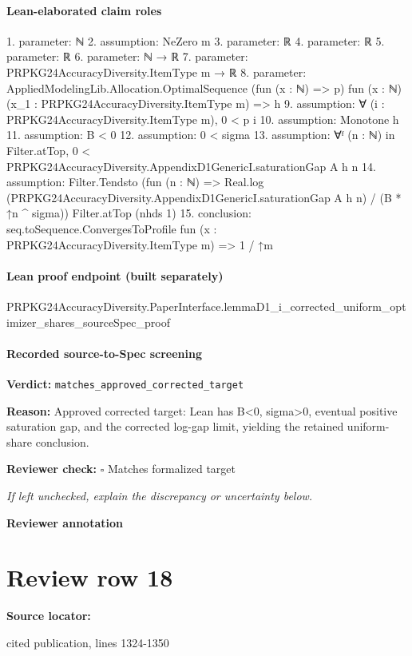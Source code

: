 \documentclass[10pt]{article}
\newcommand{\reviewerbox}{%
  \par\noindent\fbox{\parbox{0.96\linewidth}{\rule{0pt}{0.38in}}}\par
}
\newcommand{\reviewmatch}[1]{%
  \par\noindent\textbf{Reviewer check:} $\square$\; #1\par
  \noindent\emph{If left unchecked, explain the discrepancy or uncertainty below.}\par
}
\begin{document}
\paragraph{Lean-elaborated claim roles}\begin{ReviewVerbatim}
1. parameter: ℕ
2. assumption: NeZero m
3. parameter: ℝ
4. parameter: ℝ
5. parameter: ℝ
6. parameter: ℕ → ℝ
7. parameter: PRPKG24AccuracyDiversity.ItemType m → ℝ
8. parameter: AppliedModelingLib.Allocation.OptimalSequence (fun (x : ℕ) => p)
  fun (x : ℕ) (x_1 : PRPKG24AccuracyDiversity.ItemType m) => h
9. assumption: ∀ (i : PRPKG24AccuracyDiversity.ItemType m), 0 < p i
10. assumption: Monotone h
11. assumption: B < 0
12. assumption: 0 < sigma
13. assumption: ∀ᶠ (n : ℕ) in Filter.atTop, 0 < PRPKG24AccuracyDiversity.AppendixD1GenericI.saturationGap A h n
14. assumption: Filter.Tendsto
  (fun (n : ℕ) => Real.log (PRPKG24AccuracyDiversity.AppendixD1GenericI.saturationGap A h n) / (B * ↑n ^ sigma))
  Filter.atTop (nhds 1)
15. conclusion: seq.toSequence.ConvergesToProfile fun (x : PRPKG24AccuracyDiversity.ItemType m) => 1 / ↑m
\end{ReviewVerbatim}

\paragraph{Lean proof endpoint (built separately)}\begin{ReviewVerbatim}
PRPKG24AccuracyDiversity.PaperInterface.lemmaD1_i_corrected_uniform_optimizer_shares_sourceSpec_proof
\end{ReviewVerbatim}

\paragraph{Recorded source-to-Spec screening}
\textbf{Verdict:} \texttt{matches\_approved\_corrected\_target}
\\
{\raggedright
\textbf{Reason:} Approved corrected target:\allowbreak{} Lean has B<0, sigma>0, eventual positive saturation gap, and the corrected log-\allowbreak{}gap limit, yielding the retained uniform-\allowbreak{}share conclusion.\allowbreak{}
\par}
\reviewmatch{Matches formalized target}
\noindent\textbf{Reviewer annotation}\par
\reviewerbox
\clearpage
\hypertarget{source-claim-f95d0c81ab1b47f3}{}
\section*{Review row 18}
\textbf{Source locator:} {\footnotesize\raggedright cited publication, lines 1324-\allowbreak{}1350\par}
\end{document}
